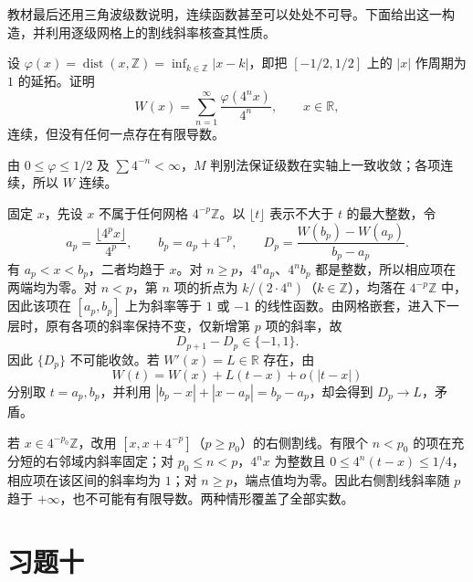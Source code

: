 教材最后还用三角波级数说明，连续函数甚至可以处处不可导。下面给出这一构造，并利用逐级网格上的割线斜率核查其性质。

\begin{example}
\label{ex:continuous-nowhere-differentiable-triangular-series}
设 $\varphi(x)=\operatorname{dist}(x,\mathbb Z)=\inf_{k\in\mathbb Z}|x-k|$，即把 $[-1/2,1/2]$ 上的 $|x|$ 作周期为 $1$ 的延拓。证明
\[
    W(x)=\sum_{n=1}^\infty\frac{\varphi(4^nx)}{4^n},
    \qquad x\in\mathbb R,
\]
连续，但没有任何一点存在有限导数。
\end{example}

\begin{solve}
由 $0\leq\varphi\leq1/2$ 及 $\sum4^{-n}<\infty$，$M$ 判别法保证级数在实轴上一致收敛；各项连续，所以 $W$ 连续。

固定 $x$，先设 $x$ 不属于任何网格 $4^{-p}\mathbb Z$。以 $\lfloor t\rfloor$ 表示不大于 $t$ 的最大整数，令
\[
    a_p=\frac{\lfloor4^px\rfloor}{4^p},\qquad b_p=a_p+4^{-p},
    \qquad D_p=\frac{W(b_p)-W(a_p)}{b_p-a_p}.
\]
有 $a_p<x<b_p$，二者均趋于 $x$。对 $n\geq p$，$4^na_p$、$4^nb_p$ 都是整数，所以相应项在两端均为零。对 $n<p$，第 $n$ 项的折点为 $k/(2\cdot4^n)$（$k\in\mathbb Z$），均落在 $4^{-p}\mathbb Z$ 中，因此该项在 $[a_p,b_p]$ 上为斜率等于 $1$ 或 $-1$ 的线性函数。由网格嵌套，进入下一层时，原有各项的斜率保持不变，仅新增第 $p$ 项的斜率，故
\[
    D_{p+1}-D_p\in\{-1,1\}.
\]
因此 $\{D_p\}$ 不可能收敛。若 $W'(x)=L\in\mathbb R$ 存在，由
\[
    W(t)=W(x)+L(t-x)+o(|t-x|)
\]
分别取 $t=a_p,b_p$，并利用 $|b_p-x|+|x-a_p|=b_p-a_p$，却会得到 $D_p\to L$，矛盾。

若 $x\in4^{-p_0}\mathbb Z$，改用 $[x,x+4^{-p}]$（$p\geq p_0$）的右侧割线。有限个 $n<p_0$ 的项在充分短的右邻域内斜率固定；对 $p_0\leq n<p$，$4^nx$ 为整数且 $0\leq4^n(t-x)\leq1/4$，相应项在该区间的斜率均为 $1$；对 $n\geq p$，端点值均为零。因此右侧割线斜率随 $p$ 趋于 $+\infty$，也不可能有有限导数。两种情形覆盖了全部实数。
\end{solve}

\section*{习题十}
